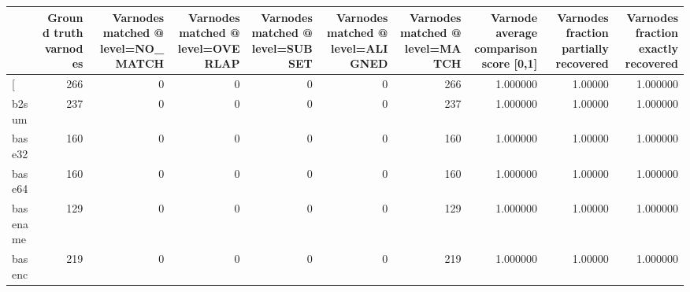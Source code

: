 \begin{tabular}{lrrrrrrrrr}
\toprule
{} &  Ground truth varnodes &  Varnodes matched @ level=NO\_MATCH &  Varnodes matched @ level=OVERLAP &  Varnodes matched @ level=SUBSET &  Varnodes matched @ level=ALIGNED &  Varnodes matched @ level=MATCH &  Varnode average comparison score [0,1] &  Varnodes fraction partially recovered &  Varnodes fraction exactly recovered \\
\midrule
[         &                    266 &                                  0 &                                 0 &                                0 &                                 0 &                             266 &                                1.000000 &                                1.00000 &                             1.000000 \\
b2sum     &                    237 &                                  0 &                                 0 &                                0 &                                 0 &                             237 &                                1.000000 &                                1.00000 &                             1.000000 \\
base32    &                    160 &                                  0 &                                 0 &                                0 &                                 0 &                             160 &                                1.000000 &                                1.00000 &                             1.000000 \\
base64    &                    160 &                                  0 &                                 0 &                                0 &                                 0 &                             160 &                                1.000000 &                                1.00000 &                             1.000000 \\
basename  &                    129 &                                  0 &                                 0 &                                0 &                                 0 &                             129 &                                1.000000 &                                1.00000 &                             1.000000 \\
basenc    &                    219 &                                  0 &                                 0 &                                0 &                                 0 &                             219 &                                1.000000 &                                1.00000 &                             1.000000 \\

\end{tabular}
